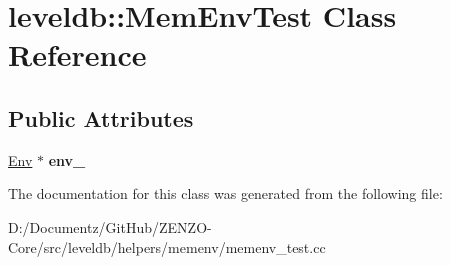 \hypertarget{classleveldb_1_1_mem_env_test}{}\section{leveldb\+::Mem\+Env\+Test Class Reference}
\label{classleveldb_1_1_mem_env_test}
\subsection*{Public Attributes}
\begin{DoxyCompactItemize}
\item 
\mbox{\label{classleveldb_1_1_mem_env_test_a76f81d9090cc4c3cce4a81d8af745359}} 
\mbox{\hyperlink{classleveldb_1_1_env}{Env}} $\ast$ {\bfseries env\+\_\+}
\end{DoxyCompactItemize}


The documentation for this class was generated from the following file\+:\begin{DoxyCompactItemize}
\item 
D\+:/\+Documentz/\+Git\+Hub/\+Z\+E\+N\+Z\+O-\/\+Core/src/leveldb/helpers/memenv/memenv\+\_\+test.\+cc\end{DoxyCompactItemize}

